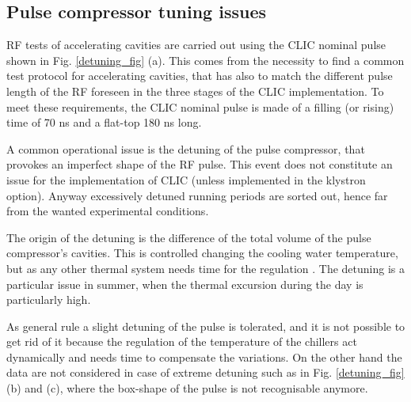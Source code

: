 \subsection[Pulse compressor tuning issues]{Pulse compressor tuning issues}

RF tests of accelerating cavities are carried out using the CLIC nominal pulse shown in Fig. \ref{detuning_fig} (a). This comes from the necessity to find a common test protocol for accelerating cavities, that has also to match the different pulse length of the RF foreseen in the three stages of the CLIC implementation. To meet these requirements, the CLIC nominal pulse is made of a filling (or rising) time of 70 ns and a flat-top 180 ns long.

A common operational issue is the detuning of the pulse compressor, that provokes an imperfect shape of the RF pulse. This event does not constitute an issue for the implementation of CLIC (unless implemented in the klystron option). Anyway excessively detuned running periods are sorted out, hence far from the wanted experimental conditions. 

The origin of the detuning is the difference of the total volume of the pulse compressor's cavities. This is controlled changing the cooling water temperature, but as any other thermal system needs time for the regulation \cite{Woolley:CWS2016}. The detuning is a particular issue in summer, when the thermal excursion during the day is particularly high.

As general rule a slight detuning of the pulse is tolerated, and it is not possible to get rid of it because the regulation of the temperature of the chillers act dynamically and needs time to compensate the variations. On the other hand the data are not considered in case of extreme detuning such as in Fig. \ref{detuning_fig} (b) and (c), where the box-shape of the pulse is not recognisable anymore. 

